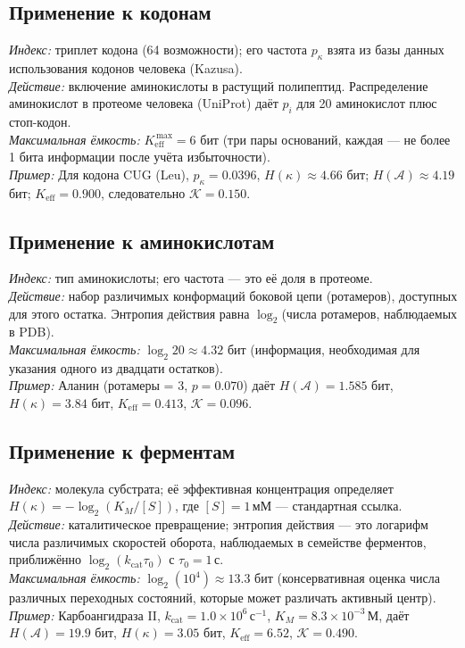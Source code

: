 \documentclass[12pt,a4paper]{article}
\newcommand{\REL}{\mathcal{K}}          %
\newcommand{\ABS}{K_{\mathrm{eff}}}     %
\begin{document}
	\subsection{Применение к кодонам}
	\textit{Индекс:} триплет кодона (64 возможности); его частота \(p_\kappa\) взята из базы данных использования кодонов человека (Kazusa). \\
	\textit{Действие:} включение аминокислоты в растущий полипептид. Распределение аминокислот в протеоме человека (UniProt) даёт \(p_i\) для 20 аминокислот плюс стоп-кодон. \\
	\textit{Максимальная ёмкость:} \(\ABS^{\,\max}=6\) бит (три пары оснований, каждая — не более 1 бита информации после учёта избыточности). \\
	\textit{Пример:} Для кодона CUG (Leu), \(p_\kappa=0.0396\), \(H(\kappa)\approx4.66\) бит; \(H(\mathcal{A})\approx4.19\) бит; \(\ABS=0.900\), следовательно \(\REL=0.150\).
	
	\subsection{Применение к аминокислотам}
	\textit{Индекс:} тип аминокислоты; его частота — это её доля в протеоме. \\
	\textit{Действие:} набор различимых конформаций боковой цепи (ротамеров), доступных для этого остатка. Энтропия действия равна \(\log_2\)(числа ротамеров, наблюдаемых в PDB). \\
	\textit{Максимальная ёмкость:} \(\log_2 20 \approx 4.32\) бит (информация, необходимая для указания одного из двадцати остатков). \\
	\textit{Пример:} Аланин (ротамеры = 3, \(p=0.070\)) даёт \(H(\mathcal{A})=1.585\) бит, \(H(\kappa)=3.84\) бит, \(\ABS=0.413\), \(\REL=0.096\).
	
	\subsection{Применение к ферментам}
	\textit{Индекс:} молекула субстрата; её эффективная концентрация определяет \(H(\kappa) = -\log_2(K_M/[S])\), где \([S]=1\,\text{мМ}\) — стандартная ссылка. \\
	\textit{Действие:} каталитическое превращение; энтропия действия — это логарифм числа различимых скоростей оборота, наблюдаемых в семействе ферментов, приближённо \(\log_2(k_{\mathrm{cat}}\tau_0)\) с \(\tau_0=1\,\text{с}\). \\
	\textit{Максимальная ёмкость:} \(\log_2(10^4)\approx13.3\) бит (консервативная оценка числа различных переходных состояний, которые может различать активный центр). \\
	\textit{Пример:} Карбоангидраза II, \(k_{\mathrm{cat}}=1.0\times10^6\,\text{с}^{-1}\), \(K_M=8.3\times10^{-3}\,\text{М}\), даёт \(H(\mathcal{A})=19.9\) бит, \(H(\kappa)=3.05\) бит, \(\ABS=6.52\), \(\REL=0.490\).
	
\end{document}
